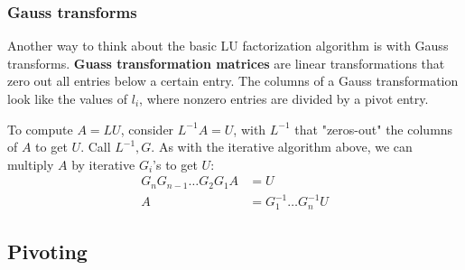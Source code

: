 \documentclass{article}
\begin{document}
\subsubsection{Gauss transforms}
Another way to think about the basic LU factorization algorithm is with Gauss transforms. \textbf{Guass transformation matrices} are linear transformations that zero out all entries below a certain entry. The columns of a Gauss transformation look like the values of $l_i$, where nonzero entries are divided by a pivot entry.

To compute $A=LU$, consider $L^{-1}A = U$, with $L^{-1}$ that "zeros-out" the columns of $A$ to get $U$. Call $L^{-1}, G$. As with the iterative algorithm above, we can multiply $A$ by iterative $G_i$'s to get $U$:
\begin{align*}
    G_nG_{n-1}\dots G_2G_1A &= U\\
    A &= G_1^{-1}\dots G_n^{-1}U
\end{align*}


\subsection{Pivoting}
\end{document}
